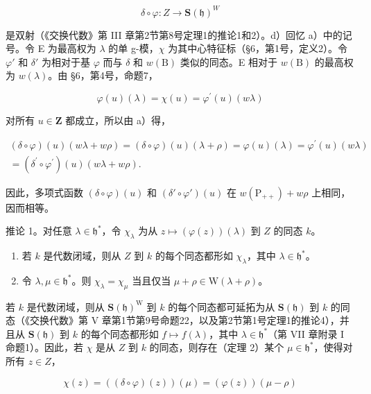 \[
\delta \circ \varphi : Z \to \mathbf {S} (\mathfrak {h}) ^ {W}
\]

是双射（《交换代数》第 III 章第2节第8号定理1的推论1和2）。d）回忆 a）中的记号。令 E 为最高权为 \(\lambda\) 的单 g-模，\(\chi\) 为其中心特征标（§6，第1号，定义2）。令 \(\varphi'\) 和 \(\delta'\) 为相对于基 \(\varphi\) 而与 \(\delta\) 和 \(w(\mathrm{B})\) 类似的同态。E 相对于 \(w(\mathrm{B})\) 的最高权为 \(w(\lambda)\)。由 §6，第4号，命题7，

\[
\varphi (u) (\lambda) = \chi (u) = \varphi^ {\prime} (u) (w \lambda)
\]

对所有 \(u\in \mathbf{Z}\) 都成立，所以由 a）得，

\[
\begin{array}{c} (\delta \circ \varphi) (u) (w \lambda + w \rho) = (\delta \circ \varphi) (u) (\lambda + \rho) = \varphi (u) (\lambda) = \varphi^ {\prime} (u) (w \lambda) \\ = (\delta^ {\prime} \circ \varphi^ {\prime}) (u) (w \lambda + w \rho). \end{array}
\]

因此，多项式函数 \((\delta \circ \varphi)(u)\) 和 \((\delta' \circ \varphi')(u)\) 在 \(w(\mathrm{P}_{++}) + w\rho\) 上相同，因而相等。

推论 1。对任意 \(\lambda \in \mathfrak{h}^*\)，令 \(\chi_{\lambda}\) 为从 \(z \mapsto (\varphi(z))(\lambda)\) 到 \(Z\) 的同态 \(k\)。

\begin{enumerate}
\def\labelenumi{(\roman{enumi})}
\item
  若 \(k\) 是代数闭域，则从 \(Z\) 到 \(k\) 的每个同态都形如 \(\chi_{\lambda}\)，其中 \(\lambda \in \mathfrak{h}^*\)。
\item
  令 \(\lambda, \mu \in \mathfrak{h}^*\)。则 \(\chi_{\lambda} = \chi_{\mu}\) 当且仅当 \(\mu + \rho \in \mathrm{W}(\lambda + \rho)\)。
\end{enumerate}

若 \(k\) 是代数闭域，则从 \(\mathbf{S}(\mathfrak{h})^{\mathrm{W}}\) 到 \(k\) 的每个同态都可延拓为从 \(\mathbf{S}(\mathfrak{h})\) 到 \(k\) 的同态（《交换代数》第 V 章第1节第9号命题22，以及第2节第1号定理1的推论4），并且从 \(\mathbf{S}(\mathfrak{h})\) 到 \(k\) 的每个同态都形如 \(f \mapsto f(\lambda)\)，其中 \(\lambda \in \mathfrak{h}^*\)（第 VII 章附录 I 命题1）。因此，若 \(\chi\) 是从 \(Z\) 到 \(k\) 的同态，则存在（定理 2）某个 \(\mu \in \mathfrak{h}^*\)，使得对所有 \(z \in Z\)，

\[
\chi (z) = ((\delta \circ \varphi) (z)) (\mu) = (\varphi (z)) (\mu - \rho)
\]

